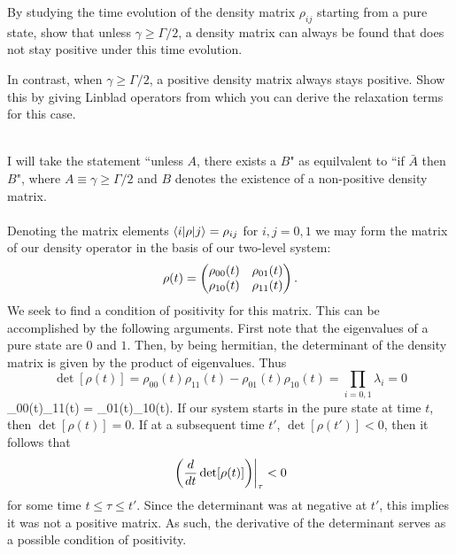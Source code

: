 \documentclass[10pt,letterpaper]{article}
\begin{document}
\benum

	\item By studying the time evolution of the density matrix $\rho_{ij}$ starting from a pure state, show that unless $\gamma\geq\Gamma/2$, a density matrix can always be found that does not stay positive under this time evolution.

	\item In contrast, when $\gamma\geq\Gamma/2$, a positive density matrix always stays positive. Show this by giving Linblad operators from which you can derive the relaxation terms for this case. \\ \\
\eenum
\benum
\item
I will take the statement ``unless $A$, there exists a $B$" as equilvalent to ``if $\bar A$ then $B$", where 
$A \equiv \gamma \ge \Gamma/2$ and $B$ denotes the existence of a non-positive density matrix. 
\\ \\
Denoting the matrix elements $\braket{i|\rho|j} = \rho_{ij}$ for $i,j = 0,1$ we may form the matrix of our density
operator in the basis of our two-level system:
\[
	\rho(t) = \begin{pmatrix} \rho_{00}(t) &\rho_{01}(t) \\ \rho_{10}(t) & \rho_{11}(t) \end{pmatrix}.
\]
We seek to find a condition of positivity for this matrix. This can be accomplished by the following arguments. First
note that the eigenvalues of a pure state are $0$ and $1$. Then, by being hermitian, the 
determinant of the density matrix is given by the product of eigenvalues. Thus
\[
	\det[\rho(t)] = \rho_{00}(t)\rho_{11}(t) - \rho_{01}(t)\rho_{10}(t) = \prod_{i=0,1}\lambda_i = 0
\]
\be\label{6}
	\Rightarrow \rho_{00}(t)\rho_{11}(t) =  \rho_{01}(t)\rho_{10}(t).
\ee
If our system starts in the pure state at time $t$, then $\det[\rho(t)] = 0$. If at a subsequent time 
$t'$, $\det[\rho(t')] < 0$, then it follows that 
\[
	\left.\left(\frac{d}{dt} \det[\rho(t)]\right)\right|_{\tau} < 0
\]
for some time $t \le \tau \le t'$. Since the determinant was at negative at $t'$, this implies it was not a positive matrix. As such, the derivative of the determinant serves as a possible condition of positivity.
\end{document}
